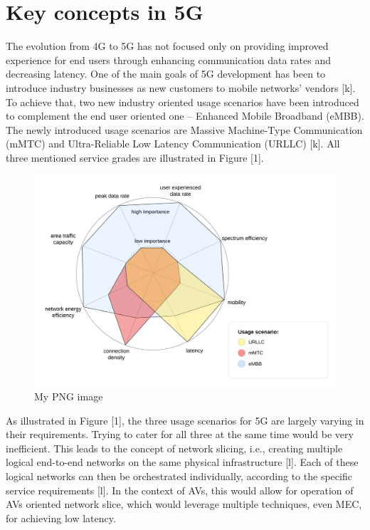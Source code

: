 \documentclass[12pt,a4paper,twoside]{report}
\begin{document}
\section{Key concepts in 5G}
The evolution from 4G to 5G has not focused only on providing improved experience for end users through enhancing communication data rates and decreasing latency. One of the main goals of 5G development has been to introduce industry businesses as new customers to mobile networks’ vendors [k]. To achieve that, two new industry oriented usage scenarios have been introduced to complement the end user oriented one – Enhanced Mobile Broadband (eMBB). The newly introduced usage scenarios are Massive Machine-Type Communication (mMTC) and Ultra-Reliable Low Latency Communication (URLLC) [k]. All three mentioned service grades are illustrated in Figure [1].
\begin{figure}[ht]
	\centering
	\includegraphics[width=\textwidth]{./images/usage-scenarios.png}
	\caption{My PNG image}
  \end{figure}

As illustrated in Figure [1], the three usage scenarios for 5G are largely varying in their requirements. Trying to cater for all three at the same time would be very inefficient. This leads to the concept of network slicing, i.e., creating multiple logical end-to-end networks on the same physical infrastructure [l]. Each of these logical networks can then be orchestrated individually, according to the specific service requirements [l]. In the context of AVs, this would allow for operation of AVs oriented network slice, which would leverage multiple techniques, even MEC, for achieving low latency. 
\end{document}
